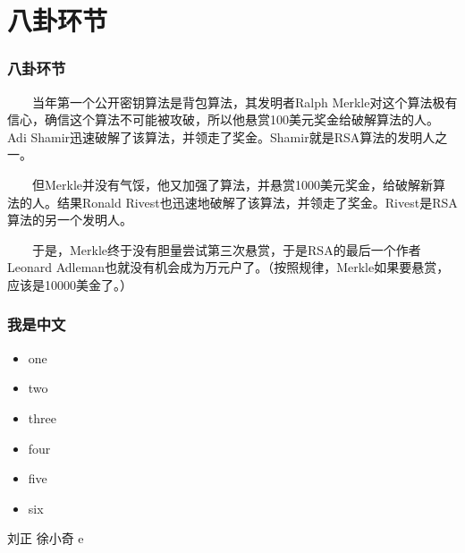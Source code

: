 \documentclass[slidestop,compress,mathserif]{beamer}
\begin{document}
\section{八卦环节}
\begin{frame}
  \transblindsvertical
  \frametitle{八卦环节}
 ~~~~当年第一个公开密钥算法是背包算法，其发明者Ralph Merkle对这个算法极有信心，确信这个算法不可能被攻破，所以他悬赏100美元奖金给破解算法的人。Adi Shamir迅速破解了该算法，并领走了奖金。Shamir就是RSA算法的发明人之一。

 ~~~~但Merkle并没有气馁，他又加强了算法，并悬赏1000美元奖金，给破解新算法的人。结果Ronald Rivest也迅速地破解了该算法，并领走了奖金。Rivest是RSA算法的另一个发明人。

 ~~~~于是，Merkle终于没有胆量尝试第三次悬赏，于是RSA的最后一个作者Leonard Adleman也就没有机会成为万元户了。（按照规律，Merkle如果要悬赏，应该是10000美金了。）
\end{frame}








\begin{frame}
\frametitle{我是中文} 
\begin{itemize}[<+->]
\item one
\item two
\item three
\item four
\item five
\item six
\end{itemize}

刘正 徐小奇 e
\end{frame}
\end{document}
